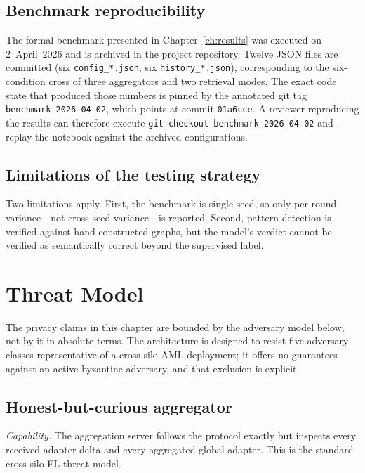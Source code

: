 \documentclass{report}
\begin{document}
\subsection{Benchmark reproducibility}

The formal benchmark presented in Chapter~\ref{ch:results} was executed on 2~April~2026 and is archived in the project repository. Twelve JSON files are committed (six \texttt{config\_*.json}, six \texttt{history\_*.json}), corresponding to the six-condition cross of three aggregators and two retrieval modes. The exact code state that produced those numbers is pinned by the annotated git tag \texttt{benchmark-2026-04-02}, which points at commit \texttt{01a6cce}. A reviewer reproducing the results can therefore execute \texttt{git checkout benchmark-2026-04-02} and replay the notebook against the archived configurations.

\subsection{Limitations of the testing strategy}

Two limitations apply. First, the benchmark is single-seed, so only per-round variance - not cross-seed variance - is reported. Second, pattern detection is verified against hand-constructed graphs, but the model's verdict cannot be verified as semantically correct beyond the supervised label.

\section{Threat Model}
\label{sec:meth:threat}

The privacy claims in this chapter are bounded by the adversary model below, not by it in absolute terms. The architecture is designed to resist five adversary classes representative of a cross-silo AML deployment; it offers no guarantees against an active byzantine adversary, and that exclusion is explicit.

\subsection{Honest-but-curious aggregator}

\textit{Capability.} The aggregation server follows the protocol exactly but inspects every received adapter delta and every aggregated global adapter. This is the standard cross-silo FL threat model.
\end{document}
